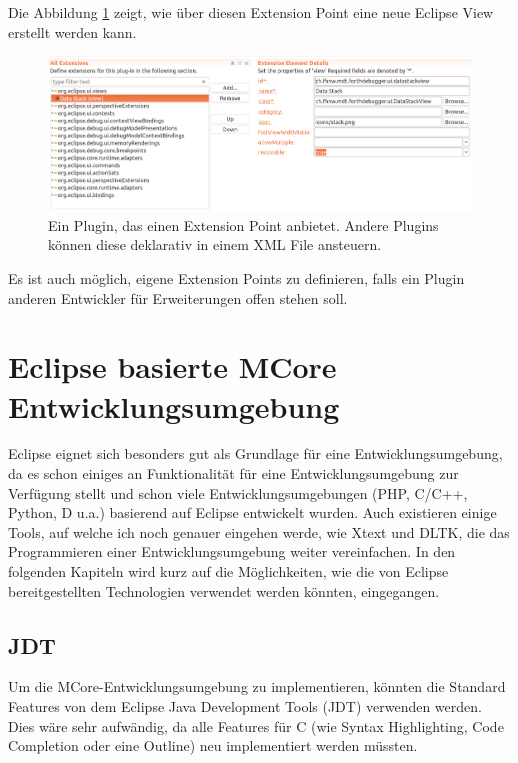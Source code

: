 \newpage
Die Abbildung \ref{fig:extensionpoint} zeigt, wie über diesen Extension Point eine neue Eclipse View erstellt werden kann.
\begin{figure}[H]
	\centering
		\includegraphics[scale=0.25]{platform/extensionpoint2.png}
		\caption{Ein Plugin, das einen Extension Point anbietet. Andere Plugins können diese deklarativ in einem XML File ansteuern.}
		\label{fig:extensionpoint}
\end{figure}

Es ist auch möglich, eigene Extension Points zu definieren, falls ein Plugin anderen Entwickler für Erweiterungen offen stehen soll.

\section{Eclipse basierte MCore Entwicklungsumgebung}

Eclipse eignet sich besonders gut als Grundlage für eine Entwicklungsumgebung, da es schon einiges an Funktionalität für eine Entwicklungsumgebung zur Verfügung stellt und schon viele Entwicklungsumgebungen (PHP, C/C++, Python, D u.a.) basierend auf Eclipse entwickelt wurden. Auch existieren einige Tools, auf welche ich noch genauer eingehen werde, wie Xtext und DLTK, die das Programmieren einer Entwicklungsumgebung weiter vereinfachen. In den folgenden Kapiteln wird kurz auf die Möglichkeiten, wie die von Eclipse bereitgestellten Technologien verwendet werden könnten, eingegangen.

\subsection{JDT}
Um die MCore-Entwicklungsumgebung zu implementieren, könnten die Standard Features von dem Eclipse Java Development Tools (JDT) verwenden werden. Dies wäre sehr aufwändig, da alle Features für C (wie Syntax Highlighting, Code Completion oder eine Outline) neu implementiert werden müssten.

